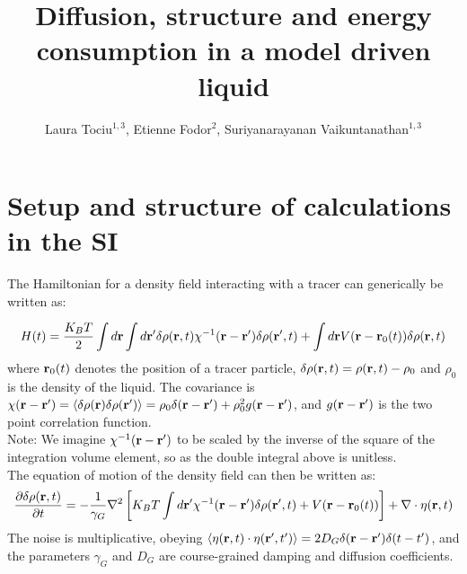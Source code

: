 \documentclass[amsmath,preprintnumbers,10pt,article,notitlepage]{revtex4-1}
\begin{document}
\title{Diffusion, structure and energy consumption in a model driven liquid}
\author{Laura Tociu$^{1,3}$, Etienne Fodor$^{2}$, Suriyanarayanan Vaikuntanathan$^{1,3}$} 

\maketitle 

\section{Setup and structure of calculations in the SI}


The Hamiltonian for a density field interacting with a tracer can generically be written as:

\begin{equation}
H(t) = \dfrac{K_BT}{2} \int d{\bf r} \int d {\bf r}' \delta \rho ({\bf r}, t) \chi^{-1}({\bf r} - {\bf r}') \delta \rho ({\bf r}', t) + \int d{\bf r} V({\bf r} - {\bf r}_0(t))\delta \rho({\bf r}, t)
\end{equation}
where ${\bf r}_0(t)$ denotes the position of a tracer particle, $\delta \rho({\bf r},t ) = \rho({\bf r}, t) - \rho_0 $ and $\rho_0$ is the density of the liquid. The covariance  is $\chi({\bf r}-{\bf r}')= \langle \delta \rho({\bf r}) \delta \rho ({\bf r}') \rangle=  \rho_0 \delta({\bf r} - {\bf r}') +\rho_0^2 g({\bf r}-{\bf r}')$, and $g({\bf r}-{\bf r}')$ is the two point correlation function. 
\\

Note:  We imagine $\chi^{-1}({\bf r}-{\bf r'})$ to be scaled by the inverse of the square of the integration volume element, so as the double integral above is unitless.
\\

The equation of motion of the density field can then be written as: 
\begin{equation}
\frac{\partial \delta \rho({\bf r}, t)}{\partial t}= - \dfrac{1}{\gamma_G} \nabla^2 \left[ K_BT \int  d{\bf r}' \chi^{-1} ({\bf r}-{\bf r}') \delta \rho({\bf r}', t) +  V({\bf r}-{\bf r}_0(t)) \right ]+ \nabla \cdot \eta({\bf r},t)
\label{eq:EvolutionField}
\end{equation}
The noise is multiplicative, obeying $\langle \eta({\bf r}, t) \cdot \eta({\bf r}', t') \rangle = 2D_G \delta({\bf r} - {\bf r}')\delta(t-t')$, and the parameters $\gamma_G$ and $D_G$ are course-grained damping and diffusion coefficients.
\end{document}
